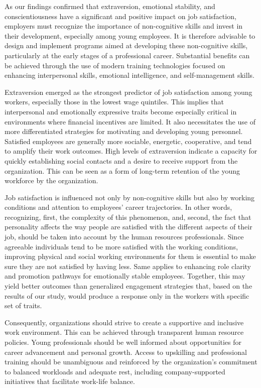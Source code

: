 \documentclass[
]{interact}
\begin{document}
As our findings confirmed that extraversion, emotional stability, and
conscientiousness have a significant and positive impact on job
satisfaction, employers must recognize the importance of non-cognitive
skills and invest in their development, especially among young
employees. It is therefore advisable to design and implement programs
aimed at developing these non-cognitive skills, particularly at the
early stages of a professional career. Substantial benefits can be
achieved through the use of modern training technologies focused on
enhancing interpersonal skills, emotional intelligence, and
self-management skills.

Extraversion emerged as the strongest predictor of job satisfaction
among young workers, especially those in the lowest wage quintiles. This
implies that interpersonal and emotionally expressive traits become
especially critical in environments where financial incentives are
limited. It also necessitates the use of more differentiated strategies
for motivating and developing young personnel. Satisfied employees are
generally more sociable, energetic, cooperative, and tend to amplify
their work outcomes. High levels of extraversion indicate a capacity for
quickly establishing social contacts and a desire to receive support
from the organization. This can be seen as a form of long-term retention
of the young workforce by the organization.

Job satisfaction is influenced not only by non-cognitive skills but also
by working conditions and attention to employees' career trajectories.
In other words, recognizing, first, the complexity of this phenomenon,
and, second, the fact that personality affects the way people are
satisfied with the different aspects of their job, should be taken into
account by the human resources professionals. Since agreeable
individuals tend to be more satisfied with the working conditions,
improving physical and social working environments for them is essential
to make sure they are not satisfied by having less. Same applies to
enhancing role clarity and promotion pathways for emotionally stable
employees. Together, this may yield better outcomes than generalized
engagement strategies that, based on the results of our study, would
produce a response only in the workers with specific set of traits.

Consequently, organizations should strive to create a supportive and
inclusive work environment. This can be achieved through transparent
human resource policies. Young professionals should be well informed
about opportunities for career advancement and personal growth. Access
to upskilling and professional training should be unambiguous and
reinforced by the organization's commitment to balanced workloads and
adequate rest, including company-supported initiatives that facilitate
work-life balance.
\end{document}

